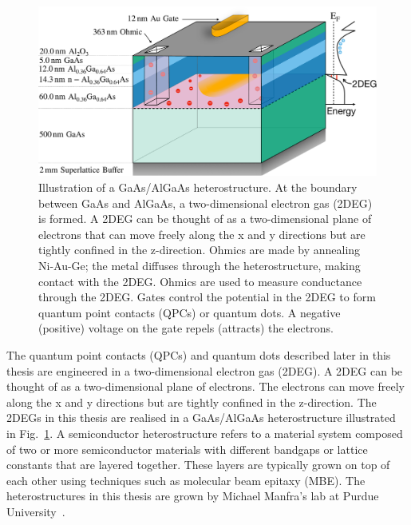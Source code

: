 \begin{figure}[!htb]
 \begin{center}
 \includegraphics[width=1.0\textwidth]{figures/ch1/figure2.pdf}
 \caption[GaAs/AlGaAs Heterostructure]{\label{fig:ch1/2Deg} 
 Illustration of a GaAs/AlGaAs heterostructure. At the boundary between GaAs and AlGaAs, a two-dimensional electron gas (2DEG) is formed. A 2DEG can be thought of as a two-dimensional plane of electrons that can move freely along the x and y directions but are tightly confined in the z-direction. Ohmics are made by annealing Ni-Au-Ge; the metal diffuses through the heterostructure, making contact with the 2DEG. Ohmics are used to measure conductance through the 2DEG. Gates control the potential in the 2DEG to form quantum point contacts (QPCs) or quantum dots. A negative (positive) voltage on the gate repels (attracts) the electrons.
 }
 \end{center}
\end{figure}



The quantum point contacts (QPCs) and quantum dots described later in this thesis are engineered in a two-dimensional electron gas (2DEG). A 2DEG can be thought of as a two-dimensional plane of electrons. The electrons can move freely along the x and y directions but are tightly confined in the z-direction. The 2DEGs in this thesis are realised in a GaAs/AlGaAs heterostructure illustrated in Fig.~\ref{fig:ch1/2Deg}. A semiconductor heterostructure refers to a material system composed of two or more semiconductor materials with different bandgaps or lattice constants that are layered together. These layers are typically grown on top of each other using techniques such as molecular beam epitaxy (MBE). The heterostructures in this thesis are grown by Michael Manfra's lab at Purdue University~\cite{manfra_high_quality}. 

